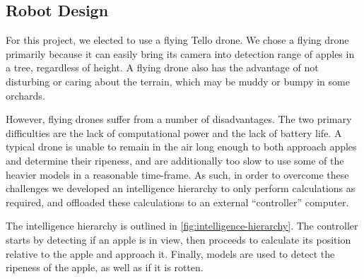\subsection{Robot Design}\label{subsec:robot-design}
For this project, we elected to use a flying Tello drone.
We chose a flying drone primarily because it can easily bring its camera into
detection range of apples in a tree, regardless of height.
A flying drone also has the advantage of not disturbing or caring about the terrain,
which may be muddy or bumpy in some orchards.

However, flying drones suffer from a number of disadvantages.
The two primary difficulties are the lack of computational power and the lack of
battery life.
A typical drone is unable to remain in the air long enough to both approach apples
and determine their ripeness, and are additionally too slow to use some of the
heavier models in a reasonable time-frame.
As such, in order to overcome these challenges we developed an intelligence hierarchy
to only perform calculations as required, and offloaded these calculations to an
external ``controller'' computer.

The intelligence hierarchy is outlined in \autoref{fig:intelligence-hierarchy}.
The controller starts by detecting if an apple is in view, then proceeds to calculate
its position relative to the apple and approach it.
Finally, models are used to detect the ripeness of the apple, as well as if it is
rotten.

